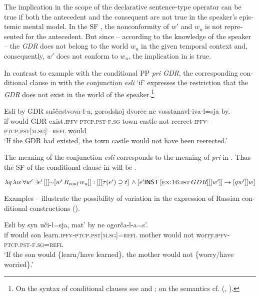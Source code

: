 \documentclass[output=paper,colorlinks,citecolor=brown]{langscibook}
\begin{document}
\begin{otherlanguage}{english}
\noindent The implication in the scope of the declarative sentence-type operator can be true if both the antecedent and the consequent are not true in the speaker's epistemic mental model. In the SF , the nonconformity of $w'$ and $w_{u}$ is not represented for the antecedent. But since -- according to the knowledge of the speaker -- the \textit{GDR} does not belong to the world $w_{u}$ in the given temporal context and, consequently, $w'$ does not conform to $w_{u}$, the implication in  is true.

In contrast to example  with the conditional PP \textit{pri GDR}, the corresponding conditional clause in  with the conjunction \textit{esli} `if' expresses the restriction that the \textit{GDR} does not exist in the world of the speaker.\footnote{On the syntax of conditional clauses see \textcite{Bhatt-Pancheva2006} and \textcite{Tomaszewicz2012}; on the semantics cf. \citeauthor{Kratzer1991} (\citeyear{Kratzer1991}, \citeyear{Kratzer1991b}).
}

\ea\label{ex:16:25}
\gll Esli by GDR suščestvova-l-a, gorodskoj dvorec ne vosstanavl-iva-l=sja by.  \\
if would GDR exist.\textsc{ipfv}-\textsc{ptcp.pst}-\textsc{f.sg} town castle not reerect-\textsc{ipfv}-\textsc{ptcp.pst}[\textsc{m.sg}]=\textsc{refl} would  \\
\glt `If the GDR had existed, the town castle would not have been reerected.'
\z

\noindent The meaning of the conjunction \textit{esli} corresponds to the meaning of \textit{pri} in . Thus the SF of the conditional clause in  will be .

\begin{exe}
\ex $\lambda q \, \lambda w \, \forall w' \, \exists e' \, [[[\sim \negthinspace \negthinspace [w' \, R_\text{conf} \, w_{u}]] : [[[\tau (e') \supseteq t] \, \wedge 
\newline
[e' \cnst{inst} \, [\textsc{ex:16:ist} \, GDR]]]w']] \to [qw']]w]  $   \label{ex:16:26}
\end{exe}

\noindent Examples – illustrate the possibility of variation in the expression of Russian conditional constructions (\citealt[vol. 2, 104ff]{Svedova1980}).

\ea\label{ex:16:27}
\gll Esli by syn uči-l=sja, mat' by ne ogorča-l-a=s'.  \\
  if would son learn.\textsc{ipfv}-\textsc{ptcp.pst}[\textsc{m.sg}]=\textsc{refl} mother would not worry.\textsc{ipfv}-\textsc{ptcp.pst}-\textsc{f.sg}=\textsc{refl} \\
\glt `If the son would \{learn/have learned\}, the mother would not \{worry/have worried\}.'
\z


\end{otherlanguage}
\end{document}
